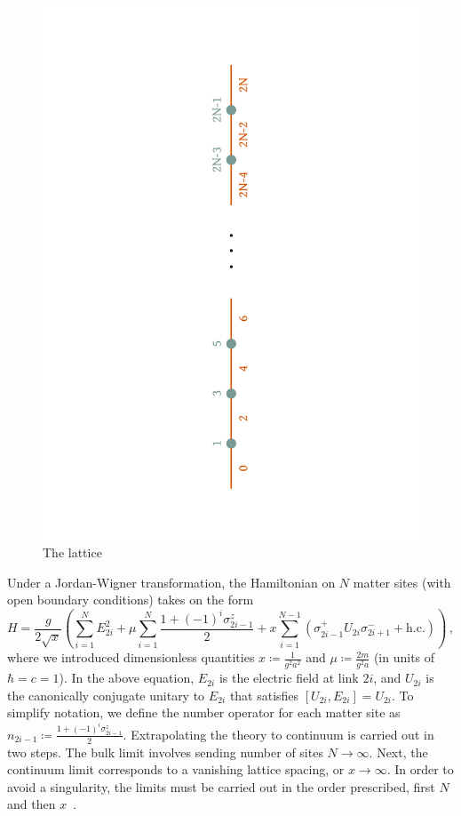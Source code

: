 \documentclass[aps,prl,reprint,superscriptaddress, onecolumn, 11pt]{revtex4-2}
\newcommand{\paren}[1]{\left(#1\right)}
\newcommand{\suml}[3]{\sum_{#1}^{#2}#3}
\newcommand{\pz}[1]{\sigma^{z}_{#1}}
\newcommand{\pplus}[1]{\sigma^{+}_{#1}}
\newcommand{\pminus}[1]{\sigma^{-}_{#1}}
\theoremstyle{definition}
\theoremstyle{definition}
\begin{document}
\begin{figure}[h]
  \centering
  \includegraphics[angle=-90, clip=true, trim=200 0 200 0,  width=\linewidth]{lattice.pdf}
  \caption{The lattice}
  \label{fig:lattice}
\end{figure}
Under a Jordan-Wigner transformation, the Hamiltonian on $N$ matter sites (with open boundary conditions) takes on the form
\begin{equation}
  \label{eq:schwingerH}
  H = \frac{g}{2\sqrt{x}}\paren{\suml{i=1}{N}{E_{2i}^2} + \mu\suml{i=1}{N}{\frac{1 + (-1)^i\pz{2i-1}}{2}} + x\suml{i=1}{N-1}{\paren{\pplus{2i-1} U_{2i} \pminus{2i+1} +\mathrm{ h.c.}}}}\, ,
\end{equation}
where we introduced dimensionless quantities $x \coloneqq \frac{1}{g^2a^2}$ and $\mu\coloneqq \frac{2m}{g^2a}$ (in units of  $\hbar = c = 1$). In the above equation, $E_{2i}$ is the electric field at link $2i$, and $U_{2i}$ is the canonically conjugate unitary to $E_{2i}$ that satisfies $[U_{2i}, E_{2i}] = U_{2i}$. To simplify notation, we define the number operator for each matter site as $n_{2i-1}\coloneqq \frac{1 + (-1)^i\pz{2i-1}}{2}$. Extrapolating the theory to continuum is carried out in two steps. The bulk limit involves sending number of sites $N\rightarrow\infty$. Next, the continuum limit corresponds to a vanishing lattice spacing, or $x\rightarrow \infty$. In order to avoid a singularity, the limits must be carried out in the order prescribed, first $N$ and then $x$~\cite{byrnes2003, hamer1982}. 
\end{document}
